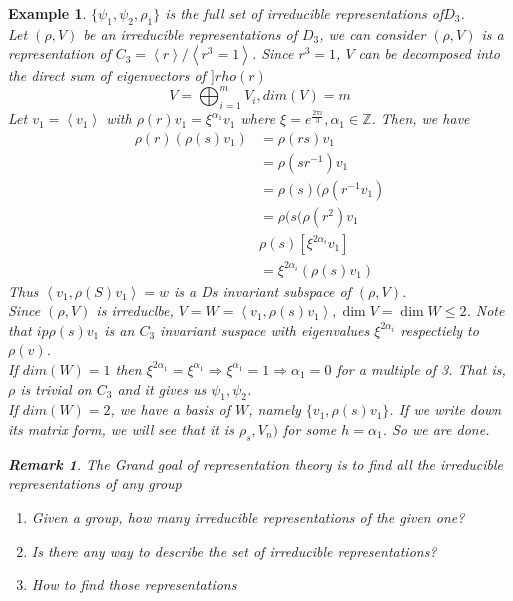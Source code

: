 \documentclass[letterpaper, leqno, 12pt]{article}
\newcommand{\fin}{\qquad \quad \hfill \framebox[1.75mm][l]{\,}}
\newcommand{\bZ}{\mathbb{Z}}
\providecommand{\ip}[1]{\left\langle #1 \right\rangle}
\newcommand {\repV} {(\rho,V)}
\theoremstyle{stdthm}
\theoremstyle{stddef}
\newtheorem{rem}[thm]{Remark} %
\newtheorem{eg}[thm]{Example} %
\theoremstyle{stdnonum}
\theoremstyle{stdqands}
\theoremstyle{stdbold}
\begin{document}
\begin{eg}
$\{\psi_1,\psi_2, \rho_1\}$ is the full set of irreducible representations of$D_3$.\\

Let $\repV$ be an irreducible representations of $D_3$, we can consider $\repV$ is a representation of $C_3 = \ip{r}/\ip{r^3 = 1}$. Since $r^3 = 1$, $V$ can be decomposed into the direct sum of eigenvectors of $]rho(r) $ 
\[V = \bigoplus_{i=1}^m V_i, dim(V)=m \]
Let $v_1 = \ip{v_1}$ with $\rho(r) v_1 = \xi^{\alpha_1}v_1$ where $\xi = e^{\frac{2\pi i}{3}}, \alpha_1 \in \bZ$. Then, we have
\begin{align*}
\rho(r)(\rho(s)v_1) &= \rho(rs) v_1 \\
&= \rho(sr^{-1}) v_1\\
&= \rho(s)(\rho(r^{-1}v_1)\\
& = \rho(s(\rho(r^2)v_1\\
&\rho(s) [ \xi^{2\alpha_i} v_1]\\
&= \xi^{2\alpha_i}(\rho(s)v_1) 
\end{align*}
 Thus $\ip{v_1, \rho(S)v_1} = w$ is a Ds invariant subspace of $(\rho,V)$.\\
 
 Since $\repV$ is irreduclbe, $V = W = \ip{v_1, \rho(s)v_1}, \dim V = \dim W \leq 2$. Note that $ip{\rho(s)v_1}$ is an $C_3$ invariant suspace with eigenvalues $\xi^{2\alpha_i}$ respectiely to $\rho (v)$. \\
 
 If $dim(W) = 1$ then $\xi ^{2\alpha_1} = \xi^{\alpha_1} \Rightarrow \xi ^{\alpha_1} = 1\Rightarrow \alpha_1 = 0$ for a multiple of 3. That is, $\rho$ is trivial on $C_3$ and it gives us $\psi_1,\psi_2$.\\ 
 
 If $dim(W)=2$, we have a basis of $W$, namely $\{v_1,\rho(s)v_1\}$. If we write down its matrix form, we will see that it is $\rho_s,V_n)$ for some $h = \alpha_1$. So we are done.

 \begin{rem}
 The Grand goal of representation theory is to find all the irreducible representations of any group
 \begin{enumerate}
 \item Given a group, how many irreducible representations of the given one? 
 \item Is there any way to describe the set of irreducible representations?
 \item How to find those representations 
 \end{enumerate}
 \end{rem} 
\end{eg}
\end{document}
